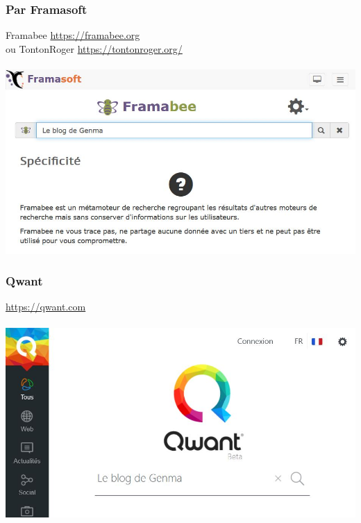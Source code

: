 \documentclass{beamer}
\begin{document}
\begin{frame}
\begin{center}
\frametitle{Par Framasoft}

Framabee \url{https://framabee.org} \\ou TontonRoger \url{https://tontonroger.org/}
\\~\\
\includegraphics[scale=0.6] {./images/Framabee.jpg}
\end{center}
\end{frame}

\begin{frame}
\begin{center}
\frametitle{Qwant}

\url{https://qwant.com}
\\~\\
\includegraphics[scale=0.6] {./images/Qwant.jpg}
\end{center}
\end{frame}
\end{document}
